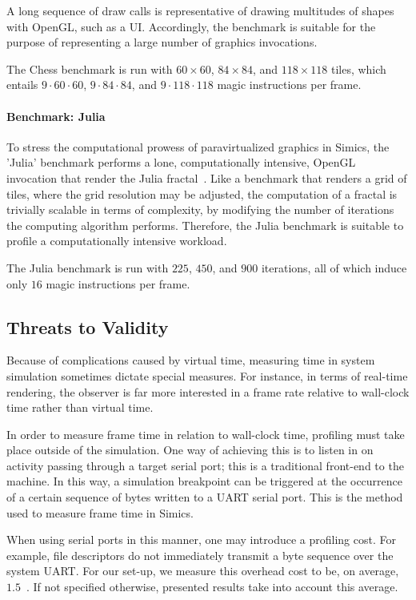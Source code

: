 A long sequence of draw calls is representative of drawing multitudes of shapes with OpenGL, such as a UI.
Accordingly, the benchmark is suitable for the purpose of representing a large number of graphics invocations.

The Chess benchmark is run with $60\times60$, $84\times84$, and $118\times118$ tiles, which entails $9\cdot60\cdot60$, $9\cdot84\cdot84$, and $9\cdot118\cdot118$ magic instructions per frame.

\paragraph{Benchmark: Julia}
\label{par:experimentalmethodology_benchmarking_benchmarkjulia}
To stress the computational prowess of paravirtualized graphics in Simics, the 'Julia' benchmark performs a lone, computationally intensive, OpenGL invocation that render the Julia fractal~.
Like a benchmark that renders a grid of tiles, where the grid resolution may be adjusted, the computation of a fractal is trivially scalable in terms of complexity, by modifying the number of iterations the computing algorithm performs.
Therefore, the Julia benchmark is suitable to profile a computationally intensive workload.

The Julia benchmark is run with $225$, $450$, and $900$ iterations, all of which induce only $16$ magic instructions per frame.

\subsection{Threats to Validity}
\label{sec:threatstovalidity}
Because of complications caused by virtual time, measuring time in system simulation sometimes dictate special measures.
For instance, in terms of real-time rendering, the observer is far more interested in a frame rate relative to wall-clock time rather than virtual time.

In order to measure frame time in relation to wall-clock time, profiling must take place outside of the simulation.
One way of achieving this is to listen in on activity passing through a target serial port; this is a traditional front-end to the machine.
In this way, a simulation breakpoint can be triggered at the occurrence of a certain sequence of bytes written to a UART serial port.
This is the method used to measure frame time in Simics.

When using serial ports in this manner, one may introduce a profiling cost.
For example, file descriptors do not immediately transmit a byte sequence over the system UART.
For our set-up, we measure this overhead cost to be, on average, $1.5$~\milli\second .
If not specified otherwise, presented results take into account this average.

